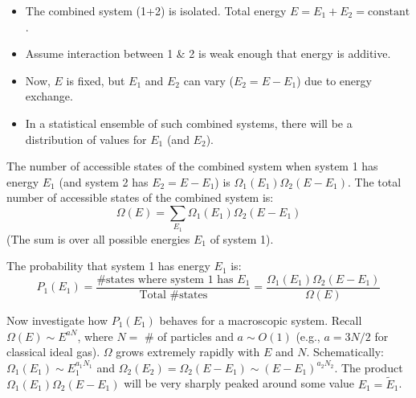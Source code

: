 \documentclass[11pt]{article}
\begin{document}
\begin{itemize}
    \item The combined system (1+2) is isolated. Total energy $E = E_1 + E_2 = \text{constant}$.
    \item Assume interaction between 1 \& 2 is weak enough that energy is additive.
    \item Now, $E$ is fixed, but $E_1$ and $E_2$ can vary ($E_2 = E-E_1$) due to energy exchange.
    \item In a statistical ensemble of such combined systems, there will be a distribution of values for $E_1$ (and $E_2$).
\end{itemize}
The number of accessible states of the combined system when system 1 has energy $E_1$ (and system 2 has $E_2=E-E_1$) is $\Omega_1(E_1) \Omega_2(E-E_1)$.
The total number of accessible states of the combined system is:
\[ \Omega(E) = \sum_{E_1} \Omega_1(E_1) \Omega_2(E-E_1) \]
(The sum is over all possible energies $E_1$ of system 1).

The probability that system 1 has energy $E_1$ is:
\[ P_1(E_1) = \frac{\text{\# states where system 1 has } E_1}{\text{Total \# states}} = \frac{\Omega_1(E_1) \Omega_2(E-E_1)}{\Omega(E)} \]

Now investigate how $P_1(E_1)$ behaves for a macroscopic system.
Recall $\Omega(E) \sim E^{aN}$, where $N=$ \# of particles and $a \sim O(1)$ (e.g., $a=3N/2$ for classical ideal gas). $\Omega$ grows extremely rapidly with $E$ and $N$.
Schematically: $\Omega_1(E_1) \sim E_1^{a_1 N_1}$ and $\Omega_2(E_2) = \Omega_2(E-E_1) \sim (E-E_1)^{a_2 N_2}$.
The product $\Omega_1(E_1) \Omega_2(E-E_1)$ will be very sharply peaked around some value $E_1 = \tilde{E}_1$.

\begin{center}
\end{center}
\end{document}
